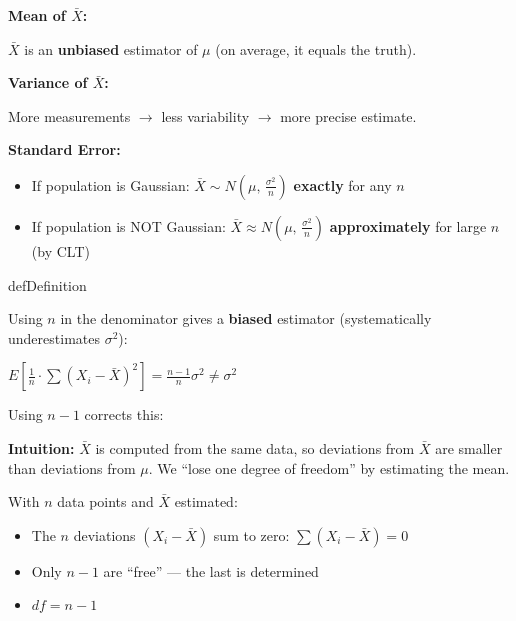 
\textbf{Mean of $\bar{X}$:}

$\bar{X}$ is an \textbf{unbiased} estimator of $\mu$ (on average, it equals the truth).

\textbf{Variance of $\bar{X}$:}

More measurements \ensuremath{\to} less variability \ensuremath{\to} more precise estimate.

\textbf{Standard Error:}


\begin{itemize}
\tightlist
\item
  If population is Gaussian: $\bar{X} \sim N\left(\mu,\, \frac{\sigma^{2}}{n}\right)$ \textbf{exactly} for any $n$
\item
  If population is NOT Gaussian: $\bar{X} \approx N\left(\mu,\, \frac{\sigma^{2}}{n}\right)$ \textbf{approximately} for large $n$ (by CLT)
\end{itemize}


\begin{PSbox}[unbreakable]{def}{Definition}


\end{PSbox}


Using $n$ in the denominator gives a \textbf{biased} estimator (systematically underestimates $\sigma^{2}$):

$\displaystyle E\left[\frac{1}{n} \cdot \sum (X_{i} - \bar{X})^{2}\right] = \frac{n-1}{n}\sigma^{2} \ne \sigma^{2}$

Using $n-1$ corrects this:

\textbf{Intuition:} $\bar{X}$ is computed from the same data, so deviations from $\bar{X}$ are smaller than deviations from $\mu$. We ``lose one degree of freedom'' by estimating the mean.


With $n$ data points and $\bar{X}$ estimated:

\begin{itemize}
\tightlist
\item
  The $n$ deviations $(X_{i} - \bar{X})$ sum to zero: $\sum (X_{i} - \bar{X}) = 0$
\item
  Only $n-1$ are ``free'' — the last is determined
\item
  $df = n - 1$
\end{itemize}

